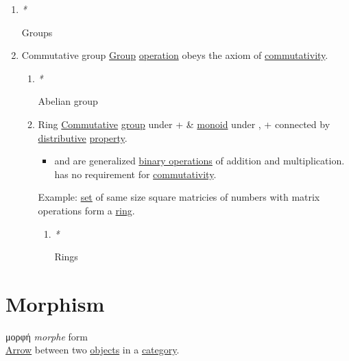 \documentclass[a4paper,14pt,oneside]{book}
\begin{document}
\begin{enumerate}
\begin{enumerate}
\item \emph{*}
\label{sec:org7bfe1c1}

\label{org9686d5f}Groups\\

\item \label{org3f594d5}Commutative group
\label{sec:org0148c53}
\hyperref[org14a82b6]{Group} \hyperref[org6ed0c27]{operation} obeys the axiom of \hyperref[orgb4c5d86]{commutativity}.\\

\begin{enumerate}
\item \emph{*}
\label{sec:orgcfbf35e}

\label{org1508d18}Abelian group\\

\item \label{orgcfda6b8}Ring
\label{sec:org1925c07}
\hyperref[orga3b086e]{Commutative} \hyperref[org14a82b6]{group} under + \& \hyperref[org2d9fbbd]{monoid} under \texttimes{}, + \texttimes{} connected by \hyperref[orgdfa9db4]{distributive} \hyperref[org91a1c9f]{property}.\\

\begin{itemize}
\item and \texttimes{} are generalized \hyperref[org126810a]{binary operations} of addition and multiplication. \texttimes{} has no requirement for \hyperref[orgb4c5d86]{commutativity}.\\
\end{itemize}

Example: \hyperref[orge119629]{set} of same size square matricies of numbers with matrix operations form a \hyperref[orgcfda6b8]{ring}.\\

\begin{enumerate}
\item \emph{*}
\label{sec:orgbe0aea1}

\label{org81832d7}Rings\\
\end{enumerate}
\end{enumerate}
\end{enumerate}
\end{enumerate}

\section{\label{org2170e98}Morphism}
\label{sec:orgdf4c001}
μορφή \emph{morphe} form\\
\hyperref[orga10ccdb]{Arrow} between two \hyperref[org22f7883]{objects} in a \hyperref[org841d8bc]{category}.\\
\end{document}
